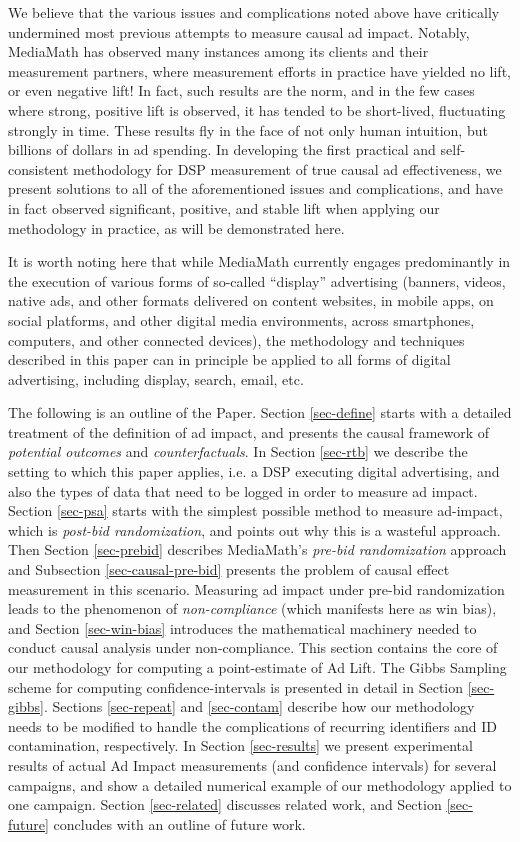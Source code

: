 \documentclass[11pt,a4paper]{article}
\theoremstyle{definition}
\theoremstyle{remark}
\theoremstyle{definition}
\theoremstyle{definition}
\theoremstyle{definition}
\theoremstyle{definition}
\theoremstyle{definition}
\theoremstyle{definition}
\begin{document}
We believe that the various issues and complications noted above have critically undermined most previous attempts to measure causal ad impact. Notably, MediaMath has observed many instances among its clients and their measurement partners, where measurement efforts in practice have yielded  no lift, or even negative lift! In fact, such results are the norm, and in the few cases where strong, positive lift is observed, it has tended to be short-lived, fluctuating strongly in time. These  results fly in the face of not only human intuition, but billions of dollars in ad spending. In developing the first practical and self-consistent methodology for DSP measurement of true causal ad effectiveness, we present solutions to all of the aforementioned issues and complications, and have in fact observed significant, positive, and stable lift when applying our methodology in practice, as will be demonstrated here.

It is worth noting here that while MediaMath currently engages predominantly in the execution of various forms of so-called “display” advertising (banners, videos, native ads, and other formats delivered on content websites, in mobile apps, on social platforms, and other digital media environments, across smartphones, computers, and other connected devices), the methodology and techniques described in this paper can in principle be applied to all forms of digital advertising, including display, search, email, etc.

The following is an outline of the Paper. Section \ref{sec-define} starts with a detailed treatment of the definition of ad impact, and presents the causal framework of \textit{potential outcomes} and \textit{counterfactuals}. 
In Section \ref{sec-rtb} we describe the setting to which this paper applies, i.e. a DSP executing digital advertising, and also the types of data that need to be logged in order to measure ad impact.
Section \ref{sec-psa} starts with the simplest possible method to measure ad-impact, which is \textit{post-bid randomization}, and points out why this is a wasteful approach.
Then Section \ref{sec-prebid} describes MediaMath's  \textit{pre-bid randomization} approach and Subsection \ref{sec-causal-pre-bid} presents the problem of causal effect measurement in this scenario. Measuring ad impact under pre-bid randomization leads to the phenomenon of \textit{non-compliance} (which manifests here as win bias),
and Section \ref{sec-win-bias} introduces the mathematical machinery 
needed to conduct causal analysis under non-compliance. 
This section contains the core of our methodology for computing a point-estimate of Ad Lift. 
The Gibbs Sampling scheme for computing confidence-intervals is presented in detail in Section \ref{sec-gibbs}. 
Sections \ref{sec-repeat} and \ref{sec-contam} describe how our methodology needs to be modified to handle the complications of recurring identifiers and ID contamination, respectively. 
In Section \ref{sec-results} we present experimental results of actual Ad Impact measurements (and confidence intervals) for several campaigns, and show a detailed numerical example of our methodology applied to one campaign.
Section \ref{sec-related} discusses related work, and  
Section \ref{sec-future} concludes with an outline of future work.
\end{document}
